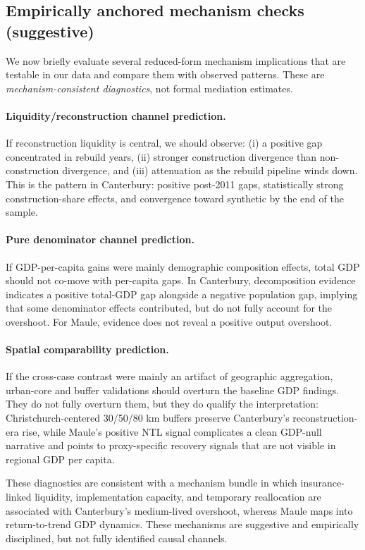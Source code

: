 \documentclass[12pt]{article}
\begin{document}
\subsection{Empirically anchored mechanism checks (suggestive)}

We now briefly evaluate several reduced-form mechanism implications that are testable in our data and compare them with observed patterns. These are \emph{mechanism-consistent diagnostics}, not formal mediation estimates.

\paragraph{Liquidity/reconstruction channel prediction.}
If reconstruction liquidity is central, we should observe: (i) a positive gap concentrated in rebuild years, (ii) stronger construction divergence than non-construction divergence, and (iii) attenuation as the rebuild pipeline winds down. This is the pattern in Canterbury: positive post-2011 gaps, statistically strong construction-share effects, and convergence toward synthetic by the end of the sample.

\paragraph{Pure denominator channel prediction.}
If GDP-per-capita gains were mainly demographic composition effects, total GDP should not co-move with per-capita gaps. In Canterbury, decomposition evidence indicates a positive total-GDP gap alongside a negative population gap, implying that some denominator effects contributed, but do not fully account for the overshoot. For Maule, evidence does not reveal a positive output overshoot.

\paragraph{Spatial comparability prediction.}
If the cross-case contrast were mainly an artifact of geographic aggregation, urban-core and buffer validations should overturn the baseline GDP findings. They do not fully overturn them, but they do qualify the interpretation: Christchurch-centered 30/50/80 km buffers preserve Canterbury's reconstruction-era rise, while Maule's positive NTL signal complicates a clean GDP-null narrative and points to proxy-specific recovery signals that are not visible in regional GDP per capita.

These diagnostics are consistent with a mechanism bundle in which insurance-linked liquidity, implementation capacity, and temporary reallocation are associated with Canterbury's medium-lived overshoot, whereas Maule maps into return-to-trend GDP dynamics. These mechanisms are suggestive and empirically disciplined, but not fully identified causal channels.
\end{document}
